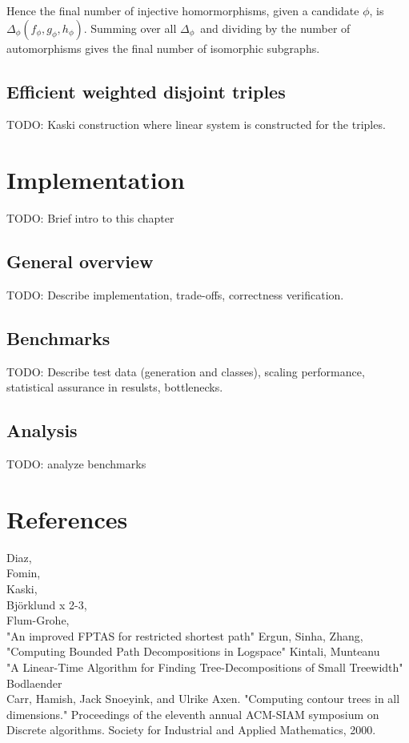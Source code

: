 \documentclass[a4paper,11pt,notitlepage]{report}
\theoremstyle{plain}
\theoremstyle{definition}
\begin{document}
Hence the final number of injective homormorphisms, given a candidate $\phi$, is $\Delta_\phi(f_\phi, g_\phi, h_\phi)$.
Summing over all $\Delta_\phi$ and dividing by the number of automorphisms gives the final number of isomorphic subgraphs.

\section{Efficient weighted disjoint triples}
TODO: Kaski construction where linear system is constructed for the triples.


\chapter{Implementation}
TODO: Brief intro to this chapter

\section{General overview}
TODO: Describe implementation, trade-offs, correctness verification.

\section{Benchmarks}
TODO: Describe test data (generation and classes), scaling performance,
statistical assurance in resulsts, bottlenecks.

\section{Analysis}
TODO: analyze benchmarks

\chapter*{References}

Diaz,\\
Fomin,\\
Kaski,\\
Björklund x 2-3,\\
Flum-Grohe, \\
"An improved FPTAS for restricted shortest path" Ergun, Sinha, Zhang,\\
"Computing Bounded Path Decompositions in Logspace" Kintali, Munteanu\\
"A Linear-Time Algorithm for Finding Tree-Decompositions of Small Treewidth" Bodlaender\\
Carr, Hamish, Jack Snoeyink, and Ulrike Axen. "Computing contour trees in all dimensions." Proceedings of the eleventh annual ACM-SIAM symposium on Discrete algorithms. Society for Industrial and Applied Mathematics, 2000.\\
\end{document}
